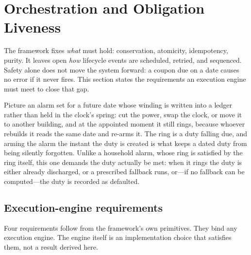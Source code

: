 \section{Orchestration and Obligation Liveness}
\label{sec:temporal}

The framework fixes \emph{what} must hold: conservation, atomicity, idempotency, purity. It leaves open \emph{how} lifecycle events are scheduled, retried, and sequenced. Safety alone does not move the system forward: a coupon due on a date causes no error if it never fires. This section states the requirements an execution engine must meet to close that gap.

\begin{mentalmodel}
Picture an alarm set for a future date whose winding is written into a ledger rather than held in the clock's spring: cut the power, swap the clock, or move it to another building, and at the appointed moment it still rings, because whoever rebuilds it reads the same date and re-arms it. The ring is a duty falling due, and arming the alarm the instant the duty is created is what keeps a dated duty from being silently forgotten. Unlike a household alarm, whose ring is satisfied by the ring itself, this one demands the duty actually be met: when it rings the duty is either already discharged, or a prescribed fallback runs, or---if no fallback can be computed---the duty is recorded as defaulted.
\end{mentalmodel}

\subsection{Execution-engine requirements}
\label{sec:exec-requirements}

Four requirements follow from the framework's own primitives. They bind any execution engine. The engine itself is an implementation choice that satisfies them, not a result derived here.

